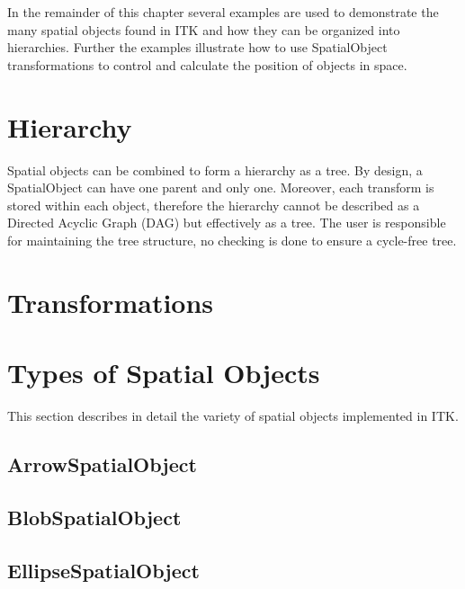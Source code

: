 In the remainder of this chapter several examples are used to demonstrate
the many spatial objects found in ITK and how they can be organized into
hierarchies. Further the examples
illustrate how to use SpatialObject transformations to control and
calculate the position of objects in space.

\section{Hierarchy}

Spatial objects can be combined to form a hierarchy as a tree. By design, a SpatialObject can
have one parent and only one. Moreover, each transform is stored within each object,
therefore the hierarchy cannot
be described as a Directed Acyclic Graph (DAG) but effectively as a tree.
The user is responsible for maintaining the tree structure, no checking is done
to ensure a cycle-free tree.

\label{sec:SpatialObjectHierarchy}



\section{Transformations}
\label{sec:SpatialObjectTransforms}



\section{Types of Spatial Objects}
\label{sec:Principal Objects}

This section describes in detail the variety of spatial objects
implemented in ITK.

\subsection{ArrowSpatialObject}
\label{sec:ArrowSpatialObject}



\subsection{BlobSpatialObject}
\label{sec:BlobSpatialObject}



\subsection{EllipseSpatialObject}
\label{sec:EllipseSpatialObject}



